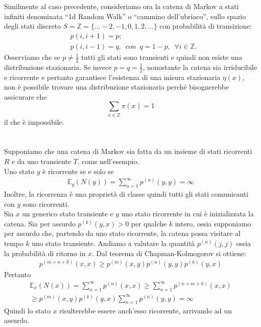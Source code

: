 \documentclass[12pt]{homework}
\begin{document}
\begin{enumerate}
Similmente al caso precedente, consideriamo ora  la catena di Markov a stati infiniti denominata ``1d Random Walk'' o ``cammino dell'ubriaco'', sullo spazio degli stati discreto $S=\mathbb{Z}=\{...-2,-1,0,1,2,...\}$ con probabilità di transizione: 
\begin{align*}
&p\left(i,i+1\right)=p;\\
&p\left(i,i-1\right)=q, \,\,\, con \,\,\, q = 1-p, \,\,\, \forall i\in \mathbb{Z}.
\end{align*}
Osserviamo che se $p \neq \frac{1}{2}$ tutti gli stati sono transienti e quindi non esiste una distribuzione stazionaria.
Se invece $p = q = \frac{1}{2}$, nonostante la catena sia irriducibile e ricorrente e pertanto garantisce l'esistenza di una misura stazionaria $\eta(x)$, non è possibile trovare una distribuzione stazionaria perché bisognerebbe assicurare che 
\[\sum_{x \in \mathbb{Z}} \pi(x) = 1\] 
il che è impossibile. 
 
\end{enumerate}

  \newpage
\section{}%

Supponiamo che una catena di Markov sia fatta da un insieme di stati ricorrenti $R$ e da uno transiente $T$, come nell'esempio.
\\Uno stato $y$ è ricorrente se e solo se 
\begin{gather*}
  \mathbb{E}_y(N(y)) =  \sum \limits_{n=1}^{\infty} p^{(n)}(y,y) = \infty
\end{gather*}
Inoltre, la ricorrenza è una proprietà di classe quindi tutti gli stati comunicanti con \(y\) sono ricorrenti.
\\
Sia \(x\) un generico stato transiente e \(y\) uno stato ricorrente in cui è inizializzata la catena. Sia per assurdo \(p^{(k)}(y,x)>0\) per qualche \(k\) intero, ossia supponiamo per assurdo che, partendo da uno stato ricorrente, la catena possa visitare al tempo \(k\) uno stato transiente. Andiamo a valutare la quantità \(p^{(n)}(j,j)\) ossia la probabilità di ritorno in \(x\). Dal teorema di Chapman-Kolmogorov si ottiene:
\begin{gather*}
  p^{(m+n+k)}(x,x) \geq p^{(m)}(x,y)p^{(n)}(y,y)p^{(k)}(y,x)
\end{gather*}
Pertanto\begin{gather*}
  \mathbb{E}_x(N(x)) =  \sum \limits_{n=1}^{\infty} p^{(n)}(x,x) \geq \sum \limits_{n=1}^{\infty} p^{(n+m+k)}(x,x) \\
  \geq p^{(m)}(x,y)p^{(k)}(y,x)\sum \limits_{n=1}^{\infty} p^{(n)}(y,y) = \infty
\end{gather*}
Quindi lo stato \(x\) risulterebbe essere anch'esso ricorrente, arrivando ad un assurdo.
\end{document}
